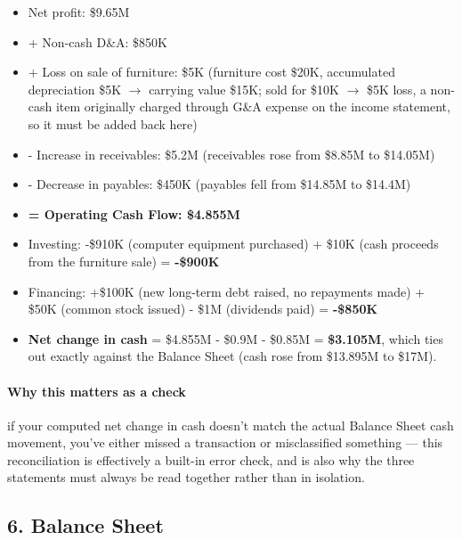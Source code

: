 \documentclass[12pt,openany]{book}
\begin{document}
\begin{itemize}[leftmargin=*]
    \item Net profit: \$9.65M
    \item + Non-cash D\&A: \$850K
    \item + Loss on sale of furniture: \$5K (furniture cost \$20K, accumulated depreciation \$5K \(\to\) carrying value \$15K; sold for \$10K \(\to\) \$5K loss, a non-cash item originally charged through G\&A expense on the income statement, so it must be added back here)
    \item - Increase in receivables: \$5.2M (receivables rose from \$8.85M to \$14.05M)
    \item - Decrease in payables: \$450K (payables fell from \$14.85M to \$14.4M)
    \item \textbf{= Operating Cash Flow: \$4.855M}
\end{itemize}

\begin{itemize}[leftmargin=*]
    \item Investing: -\$910K (computer equipment purchased) + \$10K (cash proceeds from the furniture sale) = \textbf{-\$900K}
    \item Financing: +\$100K (new long-term debt raised, no repayments made) + \$50K (common stock issued) - \$1M (dividends paid) = \textbf{-\$850K}
\end{itemize}

\begin{itemize}[leftmargin=*]
    \item \textbf{Net change in cash} = \$4.855M - \$0.9M - \$0.85M = \textbf{\$3.105M}, which ties out exactly against the Balance Sheet (cash rose from \$13.895M to \$17M).
\end{itemize}

\paragraph{Why this matters as a check} if your computed net change in cash doesn't match the actual Balance Sheet cash movement, you've either missed a transaction or misclassified something --- this reconciliation is effectively a built-in error check, and is also why the three statements must always be read together rather than in isolation.

\subsection{6. Balance Sheet}
\end{document}

